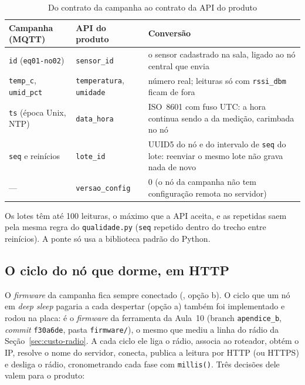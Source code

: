 \begin{table}[H]
\centering
\caption{Do contrato da campanha ao contrato da API do produto}
\label{tab:ponte}
\footnotesize
\begin{tabular}{@{}L{3.4cm}L{3.6cm}L{6.6cm}@{}}
\toprule
\textbf{Campanha (MQTT)} & \textbf{API do produto} & \textbf{Conversão} \\
\midrule
\texttt{id} (\texttt{eq01-no02}) & \texttt{sensor\_id} & o sensor cadastrado na sala, ligado ao nó central que envia \\
\texttt{temp\_c}, \texttt{umid\_pct} & \texttt{temperatura}, \texttt{umidade} & número real; leituras só com \texttt{rssi\_dbm} ficam de fora \\
\texttt{ts} (época Unix, NTP) & \texttt{data\_hora} & ISO~8601 com fuso UTC: a hora continua sendo a da medição, carimbada no nó \\
\texttt{seq} e reinícios & \texttt{lote\_id} & UUID5 do nó e do intervalo de \texttt{seq} do lote: reenviar o mesmo lote não grava nada de novo \\
--- & \texttt{versao\_config} & 0 (o nó da campanha não tem configuração remota no servidor) \\
\bottomrule
\end{tabular}
\end{table}

Os lotes têm até 100 leituras, o máximo que a API aceita, e as repetidas
saem pela mesma regra do \texttt{qualidade.py} (\texttt{seq} repetido
dentro do trecho entre reinícios). A ponte só usa a biblioteca padrão do
Python.

\subsection{O ciclo do nó que dorme, em HTTP}
\label{sec:firmware-http}
O \emph{firmware} da campanha fica sempre conectado (, opção b).
O ciclo que um nó em \emph{deep sleep} pagaria a cada despertar (opção a)
também foi implementado e rodou na placa: é o \emph{firmware} da
ferramenta da Aula~10 (branch \texttt{apendice\_b}, \emph{commit}
\texttt{f30a6de}, pasta \texttt{firmware/}), o mesmo que mediu a linha
do rádio da Seção~\ref{sec:custo-radio}. A cada ciclo ele liga o rádio,
associa ao roteador, obtém o IP, resolve o nome do servidor, conecta,
publica a leitura por HTTP (ou HTTPS) e desliga o rádio, cronometrando
cada fase com \texttt{millis()}. Três decisões dele valem para o produto:

